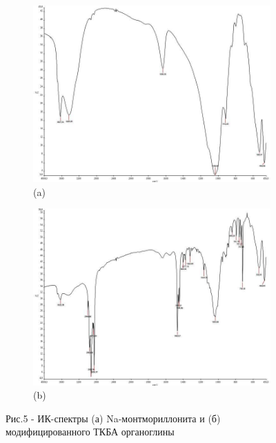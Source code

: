 \begin{figure}[H]
    \centering
    \begin{subfigure}[b]{0.45\textwidth}
        \centering
        \includegraphics[width=\textwidth]{assets/1029}
        \caption*{(a)}
    \end{subfigure}
    \hfill
    \begin{subfigure}[b]{0.45\textwidth}
        \centering
        \includegraphics[width=\textwidth]{assets/1030}
        \caption*{(b)}
    \end{subfigure}
    \caption*{Рис.5 - ИК-спектры (а) Na-монтмориллонита и (б) модифицированного ТКБА органоглины}
\end{figure}

